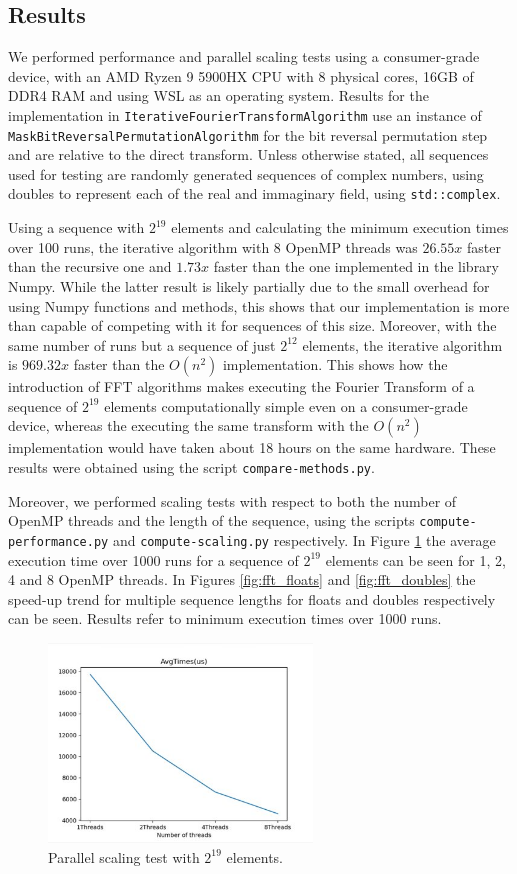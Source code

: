 \subsection{Results}
We performed performance and parallel scaling tests using a consumer-grade device, with an AMD Ryzen 9 5900HX CPU with 8 physical cores, 16GB of DDR4 RAM and using WSL as an operating system. Results for the implementation in \texttt{Iterative\-Fourier\-Transform\-Algorithm} use an instance of \texttt{Mask\-Bit\-Reversal\-Permutation\-Algorithm} for the bit reversal permutation step and are relative to the direct transform. Unless otherwise stated, all sequences used for testing are randomly generated sequences of complex numbers, using doubles to represent each of the real and immaginary field, using \texttt{std::complex}. 

Using a sequence with $2^{19}$ elements and calculating the minimum execution times over 100 runs, the iterative algorithm with 8 OpenMP threads was $26.55x$ faster than the recursive one and $1.73x$ faster than the one implemented in the library Numpy. While the latter result is likely partially due to the small overhead for using Numpy functions and methods, this shows that our implementation is more than capable of competing with it for sequences of this size. Moreover, with the same number of runs but a sequence of just $2^{12}$ elements, the iterative algorithm is $969.32x$ faster than the $O(n^2)$ implementation. This shows how the introduction of FFT algorithms makes executing the Fourier Transform of a sequence of $2^{19}$ elements computationally simple even on a consumer-grade device, whereas the executing the same transform with the $O(n^2)$ implementation would have taken about 18 hours on the same hardware. These results were obtained using the script \texttt{compare-methods.py}.

Moreover, we performed scaling tests with respect to both the number of OpenMP threads and the length of the sequence, using the scripts \texttt{compute\--performance.py} and \texttt{compute\--scaling.py} respectively. In Figure \ref{fig:fft_threads} the average execution time over 1000 runs for a sequence of $2^{19}$ elements can be seen for 1, 2, 4 and 8 OpenMP threads. In Figures \ref{fig:fft_floats} and \ref{fig:fft_doubles} the speed-up trend for multiple sequence lengths for floats and doubles respectively can be seen. Results refer to minimum execution times over 1000 runs.

\begin{figure}[ht]
    \centering
    \includegraphics[width=70mm]{image/fft_times}
    \caption{Parallel scaling test with $2^{19}$ elements.}
    \label{fig:fft_threads}
\end{figure}

